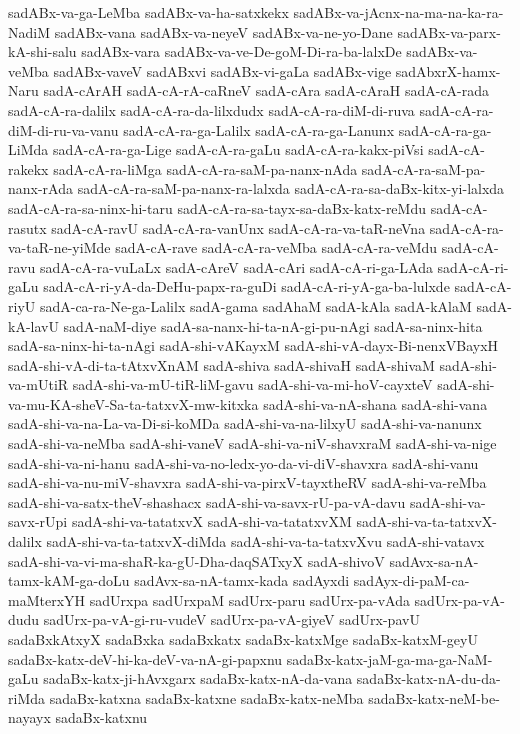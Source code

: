 {sadABx-va-ga-LeMba
sadABx-va-ha-satxkekx
sadABx-va-jAcnx-na-ma-na-ka-ra-NadiM
sadABx-vana
sadABx-va-neyeV
sadABx-va-ne-yo-Dane
sadABx-va-parx-kA-shi-salu
sadABx-vara
sadABx-va-ve-De-goM-Di-ra-ba-lalxDe
sadABx-va-veMba
sadABx-vaveV
sadABxvi
sadABx-vi-gaLa
sadABx-vige
sadAbxrX-hamx-Naru
sadA-cArAH
sadA-cA-rA-caRneV
sadA-cAra
sadA-cAraH
sadA-cA-rada
sadA-cA-ra-dalilx
sadA-cA-ra-da-lilxdudx
sadA-cA-ra-diM-di-ruva
sadA-cA-ra-diM-di-ru-va-vanu
sadA-cA-ra-ga-Lalilx
sadA-cA-ra-ga-Lanunx
sadA-cA-ra-ga-LiMda
sadA-cA-ra-ga-Lige
sadA-cA-ra-gaLu
sadA-cA-ra-kakx-piVsi
sadA-cA-rakekx
sadA-cA-ra-liMga
sadA-cA-ra-saM-pa-nanx-nAda
sadA-cA-ra-saM-pa-nanx-rAda
sadA-cA-ra-saM-pa-nanx-ra-lalxda
sadA-cA-ra-sa-daBx-kitx-yi-lalxda
sadA-cA-ra-sa-ninx-hi-taru
sadA-cA-ra-sa-tayx-sa-daBx-katx-reMdu
sadA-cA-rasutx
sadA-cA-ravU
sadA-cA-ra-vanUnx
sadA-cA-ra-va-taR-neVna
sadA-cA-ra-va-taR-ne-yiMde
sadA-cA-rave
sadA-cA-ra-veMba
sadA-cA-ra-veMdu
sadA-cA-ravu
sadA-cA-ra-vuLaLx
sadA-cAreV
sadA-cAri
sadA-cA-ri-ga-LAda
sadA-cA-ri-gaLu
sadA-cA-ri-yA-da-DeHu-papx-ra-guDi
sadA-cA-ri-yA-ga-ba-lulxde
sadA-cA-riyU
sadA-ca-ra-Ne-ga-Lalilx
sadA-gama
sadAhaM
sadA-kAla
sadA-kAlaM
sadA-kA-lavU
sadA-naM-diye
sadA-sa-nanx-hi-ta-nA-gi-pu-nAgi
sadA-sa-ninx-hita
sadA-sa-ninx-hi-ta-nAgi
sadA-shi-vAKayxM
sadA-shi-vA-dayx-Bi-nenxVBayxH
sadA-shi-vA-di-ta-tAtxvXnAM
sadA-shiva
sadA-shivaH
sadA-shivaM
sadA-shi-va-mUtiR
sadA-shi-va-mU-tiR-liM-gavu
sadA-shi-va-mi-hoV-cayxteV
sadA-shi-va-mu-KA-sheV-Sa-ta-tatxvX-mw-kitxka
sadA-shi-va-nA-shana
sadA-shi-vana
sadA-shi-va-na-La-va-Di-si-koMDa
sadA-shi-va-na-lilxyU
sadA-shi-va-nanunx
sadA-shi-va-neMba
sadA-shi-vaneV
sadA-shi-va-niV-shavxraM
sadA-shi-va-nige
sadA-shi-va-ni-hanu
sadA-shi-va-no-ledx-yo-da-vi-diV-shavxra
sadA-shi-vanu
sadA-shi-va-nu-miV-shavxra
sadA-shi-va-pirxV-tayxtheRV
sadA-shi-va-reMba
sadA-shi-va-satx-theV-shashacx
sadA-shi-va-savx-rU-pa-vA-davu
sadA-shi-va-savx-rUpi
sadA-shi-va-tatatxvX
sadA-shi-va-tatatxvXM
sadA-shi-va-ta-tatxvX-dalilx
sadA-shi-va-ta-tatxvX-diMda
sadA-shi-va-ta-tatxvXvu
sadA-shi-vatavx
sadA-shi-va-vi-ma-shaR-ka-gU-Dha-daqSATxyX
sadA-shivoV
sadAvx-sa-nA-tamx-kAM-ga-doLu
sadAvx-sa-nA-tamx-kada
sadAyxdi
sadAyx-di-paM-ca-maMterxYH
sadUrxpa
sadUrxpaM
sadUrx-paru
sadUrx-pa-vAda
sadUrx-pa-vA-dudu
sadUrx-pa-vA-gi-ru-vudeV
sadUrx-pa-vA-giyeV
sadUrx-pavU
sadaBxkAtxyX
sadaBxka
sadaBxkatx
sadaBx-katxMge
sadaBx-katxM-geyU
sadaBx-katx-deV-hi-ka-deV-va-nA-gi-papxnu
sadaBx-katx-jaM-ga-ma-ga-NaM-gaLu
sadaBx-katx-ji-hAvxgarx
sadaBx-katx-nA-da-vana
sadaBx-katx-nA-du-da-riMda
sadaBx-katxna
sadaBx-katxne
sadaBx-katx-neMba
sadaBx-katx-neM-be-nayayx
sadaBx-katxnu
}
